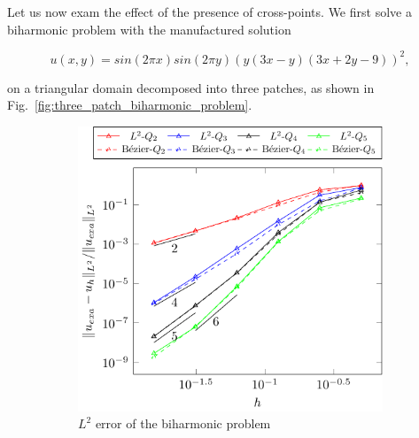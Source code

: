 \documentclass[preprint,12pt]{elsarticle}
\theoremstyle{remark}
\begin{document}
Let us now exam the effect of the presence of cross-points. We first solve a biharmonic problem with the manufactured solution

\begin{equation}
    u(x,y)=sin(2\pi{x})sin(2\pi{y})\left({y(3x-y)(3x+2y-9)}\right)^2,
\end{equation}

on a triangular domain decomposed into three patches, as shown in Fig.~\ref{fig:three_patch_biharmonic_problem}. 

\begin{figure}
    \captionsetup[subfigure]{labelformat=empty, font = footnotesize, justification=centering}
    \centering
    \begin{subfigure}{0.48\textwidth}
      \centering
      \includegraphics[width=\linewidth]{three_patch_biharmonic_basic}
      \caption{$L^2$ error of the biharmonic problem}
    \end{subfigure}%
    \begin{subfigure}{0.48\textwidth}
      \centering

\end{subfigure}
\end{figure}
\end{document}
